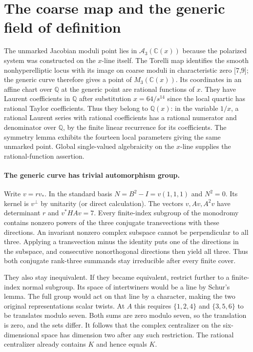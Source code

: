 \documentclass[10pt]{article}
\newcommand{\Q}{\mathbb Q}\newcommand{\C}{\mathbb C}\newcommand{\Z}{\mathbb Z}
\begin{document}
\section{The coarse map and the generic field of definition}
The unmarked Jacobian moduli point lies in $\mathcal A_3(\C(x))$ because the polarized system was constructed on the $x$-line itself. The Torelli map identifies the smooth nonhyperelliptic locus with its image on coarse moduli in characteristic zero [7,9]; the generic curve therefore gives a point of $M_3(\C(x))$. Its coordinates in an affine chart over $\Q$ at the generic point are rational functions of $x$. They have Laurent coefficients in $\Q$ after substitution $x=64/s^{14}$ since the local quartic has rational Taylor coefficients. Thus they belong to $\Q(x)$: in the variable $1/x$, a rational Laurent series with rational coefficients has a rational numerator and denominator over $\Q$, by the finite linear recurrence for its coefficients. The symmetry lemma exhibits the fourteen local parameters giving the same unmarked point. Global single-valued algebraicity on the $x$-line supplies the rational-function assertion.

\paragraph{The generic curve has trivial automorphism group.}
Write $v=r v_*$. In the standard basis $N=B^2-I=v(1,1,1)$ and $N^2=0$. Its kernel is $v^\perp$ by unitarity (or direct calculation). The vectors $v,Av,A^2v$ have determinant $r$ and $v^*HAv=7$. Every finite-index subgroup of the monodromy contains nonzero powers of the three conjugate transvections with these directions. An invariant nonzero complex subspace cannot be perpendicular to all three. Applying a transvection minus the identity puts one of the directions in the subspace, and consecutive nonorthogonal directions then yield all three. Thus both conjugate rank-three summands stay irreducible after every finite cover.

They also stay inequivalent. If they became equivalent, restrict further to a finite-index normal subgroup. Its space of intertwiners would be a line by Schur's lemma. The full group would act on that line by a character, making the two original representations scalar twists. At $A$ this requires $\{1,2,4\}$ and $\{3,5,6\}$ to be translates modulo seven. Both sums are zero modulo seven, so the translation is zero, and the sets differ. It follows that the complex centralizer on the six-dimensional space has dimension two after any such restriction. The rational centralizer already contains $K$ and hence equals $K$.
\end{document}
